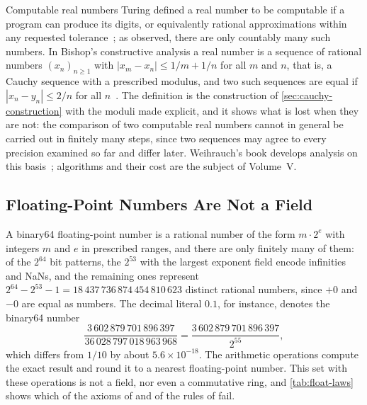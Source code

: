 \begin{note}{Computable real numbers}
Turing defined a real number to be computable if a program can produce its digits, or equivalently rational approximations within any requested tolerance~\cite{turing1936}; as  observed, there are only countably many such numbers. In Bishop's constructive analysis a real number is a sequence of rational numbers $(x_n)_{n\ge1}$ with $|x_m-x_n|\le1/m+1/n$ for all $m$ and $n$, that is, a Cauchy sequence with a prescribed modulus, and two such sequences are equal if $|x_n-y_n|\le2/n$ for all $n$~\cite{bishop1967}. The definition is the construction of \cref{sec:cauchy-construction} with the moduli made explicit, and it shows what is lost when they are not: the comparison of two computable real numbers cannot in general be carried out in finitely many steps, since two sequences may agree to every precision examined so far and differ later. Weihrauch's book develops analysis on this basis~\cite{weihrauch2000}; algorithms and their cost are the subject of Volume~V.
\end{note}

\subsection{Floating-Point Numbers Are Not a Field}

A binary64 floating-point number is a rational number of the form $m\cdot2^e$ with integers $m$ and $e$ in prescribed ranges, and there are only finitely many of them: of the $2^{64}$ bit patterns, the $2^{53}$ with the largest exponent field encode infinities and NaNs, and the remaining ones represent $2^{64}-2^{53}-1=18\,437\,736\,874\,454\,810\,623$ distinct rational numbers, since $+0$ and $-0$ are equal as numbers. The decimal literal $0.1$, for instance, denotes the binary64 number
\[
\frac{3\,602\,879\,701\,896\,397}{36\,028\,797\,018\,963\,968}=\frac{3\,602\,879\,701\,896\,397}{2^{55}},
\]
which differs from $1/10$ by about $5.6\times10^{-18}$. The arithmetic operations compute the exact result and round it to a nearest floating-point number. This set with these operations is not a field, nor even a commutative ring, and \cref{tab:float-laws} shows which of the axioms of  and of the rules of  fail.

